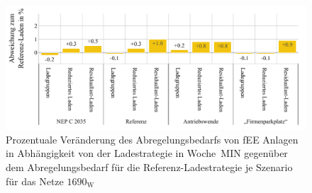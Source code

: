 \begin{figure}[H]
    \centering
    \includegraphics[width=\textwidth]{Bilder/1690_cur_fee_grid_week_A}
    \caption[Prozentuale Veränderung des Abregelungsbedarfs von fEE Anlagen in Abhängigkeit von der Ladestrategie in Woche~MIN gegenüber dem Abregelungsbedarf für die Referenz-Ladestrategie je Szenario für das Netze \num{1690}]{Prozentuale Veränderung des Abregelungsbedarfs von fEE Anlagen in Abhängigkeit von der Ladestrategie in Woche~MIN gegenüber dem Abregelungsbedarf für die Referenz-Ladestrategie je Szenario für das Netze \(1690_{\text{W}}\)}\label{fig:1690_cur_fee_grid_week_A}
\end{figure}